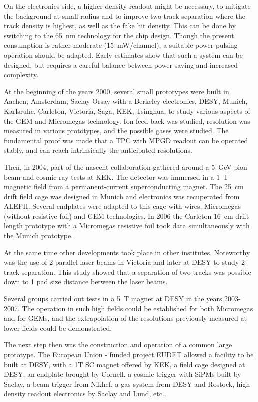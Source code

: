On the electronics side, a higher density readout might be necessary, to mitigate the background at small radius and to improve two-track separation where the track density is highest, as well as the fake hit density. This can be done by switching to the \SI{65}{nm} technology for the
chip design. Though the present consumption is rather moderate (\SI{15}{mW/channel}), a suitable power-pulsing operation should be adapted.
Early estimates show that such a system can be designed, but requires a careful balance between power saving and increased complexity.

At the beginning of the years 2000, several small prototypes were built in Aachen, Amsterdam, Saclay-Orsay with a Berkeley electronics, DESY, Munich, Karlsruhe, Carleton, Victoria, Saga, KEK, Tsinghua, to study various aspects of the GEM and Micromegas technology. Ion feed-back was studied, resolution was measured in various prototypes, and the possible gases were studied. The fundamental proof was made that a TPC with MPGD readout can be operated stably, and can reach intrinsically the anticipated resolutions.

Then, in 2004, part of the nascent collaboration gathered around a \SI{5}{GeV} pion beam and cosmic-ray tests at KEK. The detector was immersed in a \SI{1}{T} magnetic field from a permanent-current superconducting magnet. The \SI{25}{cm} drift field cage was designed in Munich and electronics was recuperated from ALEPH. Several endplates were adapted to this cage with wires, Micromegas (without resistive foil) and GEM technologies. In 2006 the Carleton \SI{16}{cm} drift length prototype with a Micromegas resistive foil took data simultaneously with the Munich prototype.

At the same time other developments took place in other institutes. Noteworthy was the use of 2 parallel laser beams in Victoria and later at DESY to study 2-track separation. This study showed that a separation of two tracks was possible down to 1 pad size distance between the laser beams.

Several groups carried out tests in a \SI{5}{T} magnet at DESY in the years 2003-2007. The operation in such high fields could be established for both Micromegas and for GEMs, and the extrapolation of the resolutions previously measured at lower fields could be demonstrated.

The next step then was the construction and operation of a common large prototype. The European Union - funded project EUDET allowed a facility to be built at DESY, with a 1T SC magnet offered by KEK, a field cage designed at DESY, an endplate brought by Cornell, a cosmic trigger with SiPMs built by Saclay, a beam trigger from Nikhef, a gas system from DESY and Rostock, high density readout electronics by Saclay and Lund, etc..

